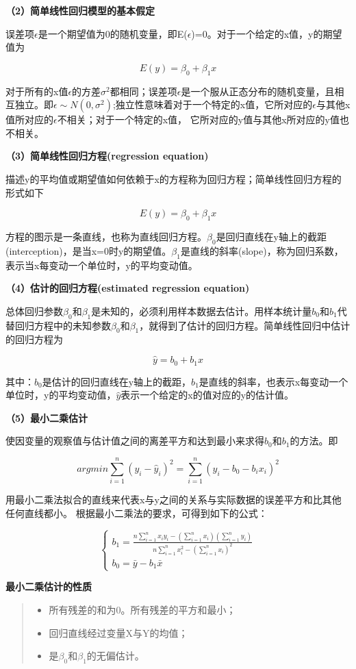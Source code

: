 \documentclass[]{ctexbook}
\providecommand{\tightlist}{%
  \setlength{\itemsep}{0pt}\setlength{\parskip}{0pt}}
\begin{document}
\textbf{（2）简单线性回归模型的基本假定}

误差项\(\epsilon\)是一个期望值为0的随机变量，即E(\(\epsilon\))=0。对于一个给定的x值，y的期望值为

\[E(y)=\beta_0+\beta_1x\]

对于所有的x值\(\epsilon\)的方差\(\sigma^2\)都相同；误差项\(\epsilon\)是一个服从正态分布的随机变量，且相互独立。即\(\epsilon\sim N(0,\sigma^2)\);独立性意味着对于一个特定的x值，它所对应的\(\epsilon\)与其他x值所对应的\(\epsilon\)不相关；对于一个特定的x值， 它所对应的y值与其他x所对应的y值也不相关。

\textbf{（3）简单线性回归方程(regression equation)}

描述y的平均值或期望值如何依赖于x的方程称为回归方程；简单线性回归方程的形式如下

\[E(y)=\beta_0+\beta_1x\]

方程的图示是一条直线，也称为直线回归方程。\(\beta_0\)是回归直线在y轴上的截距(interception)，是当x=0时y的期望值。\(\beta_1\)是直线的斜率(slope)，称为回归系数，表示当x每变动一个单位时，y的平均变动值。

\textbf{（4）估计的回归方程(estimated regression equation)}

总体回归参数\(\beta_0\)和\(\beta_1\)是未知的，必须利用样本数据去估计。用样本统计量\(b_0\)和\(b_1\)代替回归方程中的未知参数\(\beta_0\)和\(\beta_1\)，就得到了估计的回归方程。简单线性回归中估计的回归方程为

\[\hat y=b_0+b_1x\]

其中：\(b_0\)是估计的回归直线在y轴上的截距，\(b_1\)是直线的斜率，也表示x每变动一个单位时，y的平均变动值，\(\hat y\)表示一个给定的x的值对应的y的估计值。

\textbf{（5）最小二乘估计}

使因变量的观察值与估计值之间的离差平方和达到最小来求得\(b_0\)和\(b_1\)的方法。即

\[argmin \sum_{i=1}^n(y_i-\hat y_i)^2=\sum_{i=1}^n(y_i-b_0-b_ix_i)^2\]

用最小二乘法拟合的直线来代表x与y之间的关系与实际数据的误差平方和比其他任何直线都小。
根据最小二乘法的要求，可得到如下的公式：

\[\begin{cases}b_1=\frac{n\sum_{i=1}^nx_iy_i-(\sum_{i=1}^nx_i)(\sum_{i=1}^ny_i)}{n\sum_{i=1}^nx_i^2-(\sum_{i=1}^nx_i)^2}\\b_0=\bar y-b_1\bar x\end{cases}\]

\textbf{最小二乘估计的性质}

\begin{quote}
\begin{itemize}
\tightlist
\item
  所有残差的和为0。所有残差的平方和最小；
\item
  回归直线经过变量X与Y的均值；
\item
  是\(\beta_0\)和\(\beta_1\)的无偏估计。
\end{itemize}
\end{quote}
\end{document}
